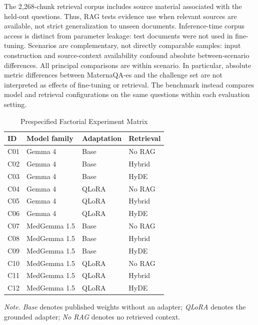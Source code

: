 The 2,268-chunk retrieval corpus includes source material associated with
the held-out questions. Thus, RAG tests evidence use when relevant sources
are available, not strict generalization to unseen documents. Inference-time
corpus access is distinct from parameter leakage: test documents were not
used in fine-tuning. Scenarios are complementary, not directly comparable
samples: input construction and source-context availability confound absolute
between-scenario differences. All principal comparisons are within scenario.
In particular, absolute metric differences between MaternaQA-es and the
challenge set are not interpreted as effects of fine-tuning or retrieval.
The benchmark instead compares model and retrieval configurations on the
same questions within each evaluation setting.

\begin{table}[t]
\footnotesize
\centering
\begin{threeparttable}
\caption{Prespecified Factorial Experiment Matrix}
\label{tab:factorial}
\begin{tabular*}{\columnwidth}{@{\extracolsep{\fill}}llll@{}}
\toprule
\textbf{ID} & \textbf{Model family} & \textbf{Adaptation} & \textbf{Retrieval} \\
\midrule
C01 & Gemma 4     & Base  & No RAG \\
C02 & Gemma 4     & Base  & Hybrid \\
C03 & Gemma 4     & Base  & HyDE \\
C04 & Gemma 4     & QLoRA & No RAG \\
C05 & Gemma 4     & QLoRA & Hybrid \\
C06 & Gemma 4     & QLoRA & HyDE \\
C07 & MedGemma 1.5 & Base  & No RAG \\
C08 & MedGemma 1.5 & Base  & Hybrid \\
C09 & MedGemma 1.5 & Base  & HyDE \\
C10 & MedGemma 1.5 & QLoRA & No RAG \\
C11 & MedGemma 1.5 & QLoRA & Hybrid \\
C12 & MedGemma 1.5 & QLoRA & HyDE \\
\bottomrule
\end{tabular*}
\begin{tablenotes}[flushleft]
\footnotesize
\item[] \textit{Note.} \textit{Base} denotes published weights without an
adapter; \textit{QLoRA} denotes the grounded adapter; \textit{No RAG} denotes
no retrieved context.
\end{tablenotes}
\end{threeparttable}
\end{table}

